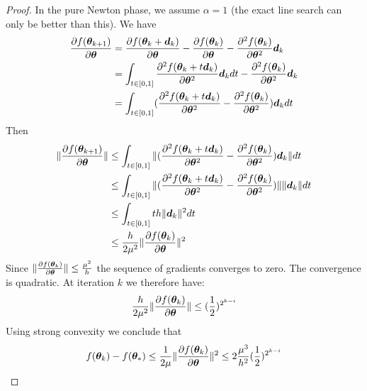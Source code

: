 \begin{proof}
   In the pure Newton phase, we assume $\alpha=1$ (the exact line search can
   only be better than this).
   We have
   \begin{align}
     \partialfrac{\thetab}{f(\thetab_{k+1})} &= \partialfrac{\thetab}{f(\thetab_{k} + \db_k)} -\partialfrac{\thetab}{f(\thetab_k)} -  \partialfrac{\thetab^2}{^2 f(\thetab_k)} \db_k \\
                                     &= \int_{t \in [0, 1]} \partialfrac{\thetab^2}{^2 f(\thetab_{k} + t \db_k)} \db_k dt  -  \partialfrac{\thetab^2}{^2 f(\thetab_k)} \db_k \\
                                     &=\int_{t \in [0, 1]} (\partialfrac{\thetab^2}{^2 f(\thetab_{k} + t \db_k)} -  \partialfrac{\thetab^2}{^2 f(\thetab_k)}) \db_k dt  \\
   \end{align}
   Then 
   \begin{align}
     \|\partialfrac{\thetab}{f(\thetab_{k+1})}\| &\leq \int_{t \in [0, 1]} \|(\partialfrac{\thetab^2}{^2 f(\thetab_{k} + t \db_k)} -  \partialfrac{\thetab^2}{^2 f(\thetab_k)}) \db_k\| dt  \\
     &\leq \int_{t \in [0, 1]} \|(\partialfrac{\thetab^2}{^2 f(\thetab_{k} + t \db_k)} -  \partialfrac{\thetab^2}{^2 f(\thetab_k)})\| \| \db_k\| dt  \\
                                         &\leq  \int_{t \in [0, 1]} t h\|\db_k\|^2 dt  \\
                                         &\leq  \frac{h}{2 \mu^2}\|\partialfrac{\thetab}{f(\thetab_{k})}\|^2 \\
   \end{align}
   Since $\|\partialfrac{\thetab}{f(\thetab_{k})}\| \leq \frac{\mu^2}{h}$ the sequence
   of gradients converges to zero. The convergence is quadratic.
   At iteration $k$ we therefore have:
   \begin{align}
   \frac{h}{2 \mu^2} \|\partialfrac{\thetab}{f(\thetab_{k})}\|
     &\leq  (\frac12)^{2^{k-i}} \\
   \end{align}
   Using strong convexity we conclude that
   \begin{align}
     f(\thetab_k) - f(\thetab_*) \leq \frac1{2 \mu} \|\partialfrac{\thetab}{f(\thetab_{k})}\|^2 \leq  2 \frac{\mu^3}{h^2} (\frac12)^{2^{k-i}}
   \end{align}
 \end{proof}

